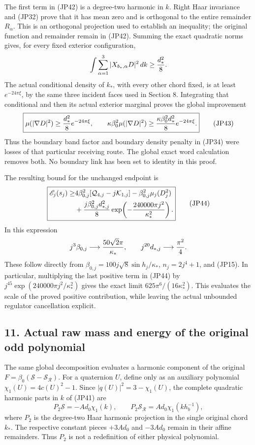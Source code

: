 \documentclass[11pt]{article}
\begin{document}
The first term in (JP42) is a degree-two harmonic in \(k\).
Right Haar invariance and (JP32) prove that it has mean zero and
is orthogonal to the entire remainder \(R_\alpha\). This is an
orthogonal projection used to establish an inequality; the original
function and remainder remain in (JP42). Summing the exact
quadratic norms gives, for every fixed exterior configuration,
\[
 \int\sum_{\alpha=1}^3|X_{b_*,\alpha}D|^2\,dk
 \ge {d_*^2\over8}.
\]
The actual conditional density of \(k_*\), with every other chord
fixed, is at least \(e^{-24\pi\xi}\), by the same three incident
faces used in Section 8. Integrating that conditional and then its
actual exterior marginal proves the global improvement
\[
 \boxed{\displaystyle
 \mu(|\nabla D|^2)\ge{d_*^2\over8}e^{-24\pi\xi},\qquad
 \kappa\beta_0^2\mu(|\nabla D|^2)
             \ge{\kappa\beta_0^2d_*^2\over8}e^{-24\pi\xi}.}
 \tag{JP43}
\]
Thus the boundary band factor and boundary density penalty in (JP34)
were losses of that particular receiving route. The global exact word
calculation removes both. No boundary link has been set to identity
in this proof.

The resulting bound for the unchanged endpoint is
\[
 \boxed{\begin{aligned}
 \mathscr E_j(s_j)\ge&
 4\beta_{0,j}^2[\mathcal Q_{4,j}-j\mathcal K_{1,j}]
                  -\beta_{0,j}^2\mu_j(D_j^2)\\
 &+{j\beta_{0,j}^2d_{*,j}^2\over8}
                  \exp\!\left(-{240000\pi j^2\over\kappa_*^2}\right).
 \end{aligned}}\tag{JP44}
\]
In this expression
\[
 j^3\beta_{0,j}\longrightarrow{50\sqrt2\pi\over\kappa_*},
 \qquad j^{20}d_{*,j}\longrightarrow{\pi^2\over4}.
\]
These follow directly from \(\beta_{0,j}=100j\sqrt8\sin h_j/\kappa_*\),
\(n_j=2j^4+1\), and (JP15). In particular, multiplying the last
positive term in (JP44) by
\(j^{45}\exp(240000\pi j^2/\kappa_*^2)\) gives the exact limit
\(625\pi^6/(16\kappa_*^2)\). This evaluates the scale of the
proved positive contribution, while leaving the actual unbounded
regulator cancellation explicit.

\subsection*{11. Actual raw mass and energy of the original odd polynomial}

The same global decomposition evaluates a harmonic component of
the original \(F=\beta_0(\mathcal S-\mathcal S_{\mathcal R})\).
For a quaternion \(U\), define only as an auxiliary polynomial
\(\chi_1(U)=4c(U)^2-1\). Since \(|q(U)|^2=3-\chi_1(U)\),
the complete quadratic harmonic parts in \(k\) of (JP41) are
\[
 P_2\mathcal S=-Ad_0\chi_1(k),\qquad
 P_2\mathcal S_{\mathcal R}=Ad_0\chi_1(kh_b^{-1}),
 \tag{JP45}
\]
where \(P_2\) is the degree-two Haar harmonic projection in the
single original chord \(k_*\). The respective constant pieces
\(+3Ad_0\) and \(-3Ad_0\) remain in their affine remainders.
Thus \(P_2\) is not a redefinition of either physical polynomial.
\end{document}
